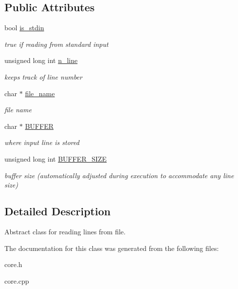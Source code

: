 \subsection*{Public Attributes}
\begin{DoxyCompactItemize}
\item 
\hypertarget{classFileBuffer_a8e4c0122ac4352e5a930248f982da2ca}{
bool \hyperlink{classFileBuffer_a8e4c0122ac4352e5a930248f982da2ca}{is\_\-stdin}}
\label{classFileBuffer_a8e4c0122ac4352e5a930248f982da2ca}

\begin{DoxyCompactList}\small\item\em true if reading from standard input \end{DoxyCompactList}\item 
\hypertarget{classFileBuffer_ab91de85b7f0eab77697c680346c4f61d}{
unsigned long int \hyperlink{classFileBuffer_ab91de85b7f0eab77697c680346c4f61d}{n\_\-line}}
\label{classFileBuffer_ab91de85b7f0eab77697c680346c4f61d}

\begin{DoxyCompactList}\small\item\em keeps track of line number \end{DoxyCompactList}\item 
\hypertarget{classFileBuffer_a416474b62bf29cc6e44dbb3d7db5fb2a}{
char $\ast$ \hyperlink{classFileBuffer_a416474b62bf29cc6e44dbb3d7db5fb2a}{file\_\-name}}
\label{classFileBuffer_a416474b62bf29cc6e44dbb3d7db5fb2a}

\begin{DoxyCompactList}\small\item\em file name \end{DoxyCompactList}\item 
\hypertarget{classFileBuffer_af93bf5b014aac504fca11ab6a2d59fb0}{
char $\ast$ \hyperlink{classFileBuffer_af93bf5b014aac504fca11ab6a2d59fb0}{BUFFER}}
\label{classFileBuffer_af93bf5b014aac504fca11ab6a2d59fb0}

\begin{DoxyCompactList}\small\item\em where input line is stored \end{DoxyCompactList}\item 
\hypertarget{classFileBuffer_a73d2b90a38cc6e8326fbc03b7ff244ef}{
unsigned long int \hyperlink{classFileBuffer_a73d2b90a38cc6e8326fbc03b7ff244ef}{BUFFER\_\-SIZE}}
\label{classFileBuffer_a73d2b90a38cc6e8326fbc03b7ff244ef}

\begin{DoxyCompactList}\small\item\em buffer size (automatically adjusted during execution to accommodate any line size) \end{DoxyCompactList}\end{DoxyCompactItemize}


\subsection{Detailed Description}
Abstract class for reading lines from file. 

The documentation for this class was generated from the following files:\begin{DoxyCompactItemize}
\item 
core.h\item 
core.cpp\end{DoxyCompactItemize}
